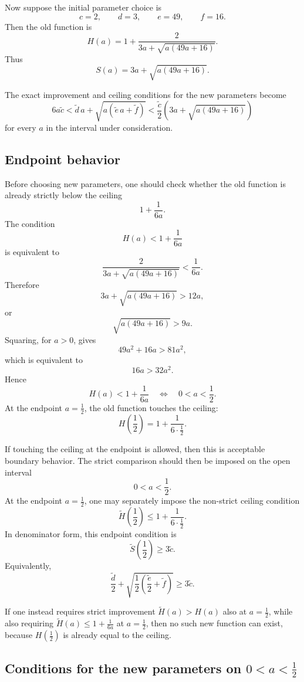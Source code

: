 \documentclass[11pt]{article}
\begin{document}
Now suppose the initial parameter choice is
\[
\boxed{
c=2,\qquad d=3,\qquad e=49,\qquad f=16.
}
\]
Then the old function is
\[
H(a)
=
1+\frac{2}{3a+\sqrt{a(49a+16)}}.
\]
Thus
\[
S(a)
=
3a+\sqrt{a(49a+16)}.
\]

The exact improvement and ceiling conditions for the new parameters become
\[
\boxed{
6a\widetilde c
<
\widetilde d\,a+\sqrt{a(\widetilde e\,a+\widetilde f)}
<
\frac{\widetilde c}{2}
\left(
3a+\sqrt{a(49a+16)}
\right)
}
\]
for every \(a\) in the interval under consideration.

\subsection*{Endpoint behavior}

Before choosing new parameters, one should check whether the old function is already strictly below the ceiling
\[
1+\frac{1}{6a}.
\]
The condition
\[
H(a)<1+\frac{1}{6a}
\]
is equivalent to
\[
\frac{2}{3a+\sqrt{a(49a+16)}}<\frac{1}{6a}.
\]
Therefore
\[
3a+\sqrt{a(49a+16)}>12a,
\]
or
\[
\sqrt{a(49a+16)}>9a.
\]
Squaring, for \(a>0\), gives
\[
49a^2+16a>81a^2,
\]
which is equivalent to
\[
16a>32a^2.
\]
Hence
\[
\boxed{
H(a)<1+\frac{1}{6a}
\quad\Longleftrightarrow\quad
0<a<\frac12.
}
\]
At the endpoint \(a=\frac12\), the old function touches the ceiling:
\[
\boxed{
H\left(\frac12\right)
=
1+\frac{1}{6\cdot\frac12}.
}
\]

If touching the ceiling at the endpoint is allowed, then this is acceptable boundary behavior.
The strict comparison should then be imposed on the open interval
\[
\boxed{
0<a<\frac12.
}
\]
At the endpoint \(a=\frac12\), one may separately impose the non-strict ceiling condition
\[
\boxed{
\widetilde H\left(\frac12\right)
\le
1+\frac{1}{6\cdot\frac12}.
}
\]
In denominator form, this endpoint condition is
\[
\boxed{
\widetilde S\left(\frac12\right)\ge 3\widetilde c.
}
\]
Equivalently,
\[
\boxed{
\frac{\widetilde d}{2}
+
\sqrt{\frac12\left(\frac{\widetilde e}{2}+\widetilde f\right)}
\ge
3\widetilde c.
}
\]

If one instead requires strict improvement
\(\widetilde H(a)>H(a)\) also at \(a=\frac12\), while also requiring
\(\widetilde H(a)\le 1+\frac{1}{6a}\) at \(a=\frac12\), then no such new function can exist, because \(H(\frac12)\) is already equal to the ceiling.

\subsection*{Conditions for the new parameters on \(0<a<\frac12\)}
\end{document}
